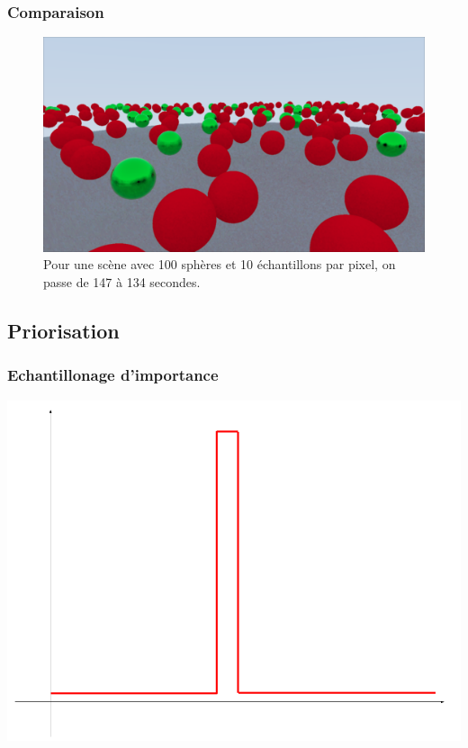 \documentclass[handout]{beamer}
\begin{document}
\begin{frame}
    \frametitle{Comparaison}

    \begin{figure}
        \includegraphics[scale=0.2]{lot.png}
        \caption{Pour une scène avec 100 sphères et 10 échantillons par pixel, on passe de 147 à 134 secondes.}
    \end{figure}

\end{frame}

\subsection{Priorisation}

\begin{frame}
    \frametitle{Echantillonage d'importance}
    \includegraphics[scale=0.3]{Priorisation.png}
\end{frame}
\end{document}
